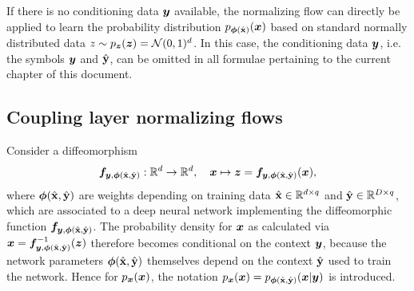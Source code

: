 \documentclass[a4paper,12pt]{report}
\begin{document}
If there is no conditioning data $\bm{y}$ available, the normalizing flow can directly be applied to learn the probability distribution $p_{\bm{\phi}(\hat{\boldsymbol{\mathbf{x}}})}(\bm{x})$ based on standard normally distributed data $z \sim p_{\bm{z}}(\bm{z}) = \mathcal{N}(0,1)^d$. In this case, the conditioning data $\bm{y}$, i.e. the symbols $\bm{y}$ and $\hat{\boldsymbol{\mathbf{y}}}$, can be omitted in all formulae pertaining to the current chapter of this document.

\subsection{Coupling layer normalizing flows}\label{subsec:couplinglayernormalizingflows}
Consider a diffeomorphism \begin{equation}
\bm{f}_{\bm{y},\bm{\phi}(\hat{\boldsymbol{\mathbf{x}}},\hat{\boldsymbol{\mathbf{y}}})}: \mathbb{R}^d \rightarrow \mathbb{R}^d, \quad \bm{x} \mapsto \bm{z} = \bm{f}_{\bm{y},\bm{\phi}(\hat{\boldsymbol{\mathbf{x}}},\hat{\boldsymbol{\mathbf{y}}})}(\bm{x}),
\end{equation} where $\bm{\phi}(\hat{\boldsymbol{\mathbf{x}}},\hat{\boldsymbol{\mathbf{y}}})$ are weights depending on training data $\hat{\boldsymbol{\mathbf{x}}} \in \mathbb{R}^{d\times q}$ and $\hat{\boldsymbol{\mathbf{y}}} \in \mathbb{R}^{D \times q}$, which are associated to a deep neural network implementing the diffeomorphic function $\bm{f}_{\bm{y},\bm{\phi}(\hat{\boldsymbol{\mathbf{x}}}, \hat{\boldsymbol{\mathbf{y}}})}$. The probability density for $\bm{x}$ as calculated via $\bm{x}= \bm{f}^{-1}_{\bm{y},\bm{\phi}(\hat{\boldsymbol{\mathbf{x}}},\hat{\boldsymbol{\mathbf{y}}})}(\bm{z})$ therefore becomes conditional on the context $\bm{y}$, because the network parameters $\bm{\phi}(\hat{\boldsymbol{\mathbf{x}}},\hat{\boldsymbol{\mathbf{y}}})$ themselves depend on the context $\hat{\boldsymbol{\mathbf{y}}}$ used to train the network. Hence for $p_{\bm{x}}(\bm{x})$, the notation $p_{\bm{x}}(\bm{x}) = p_{\bm{\phi}(\hat{\boldsymbol{\mathbf{x}}},\hat{\boldsymbol{\mathbf{y}}})}(\bm{x}|\bm{y})$ is introduced.
\end{document}
